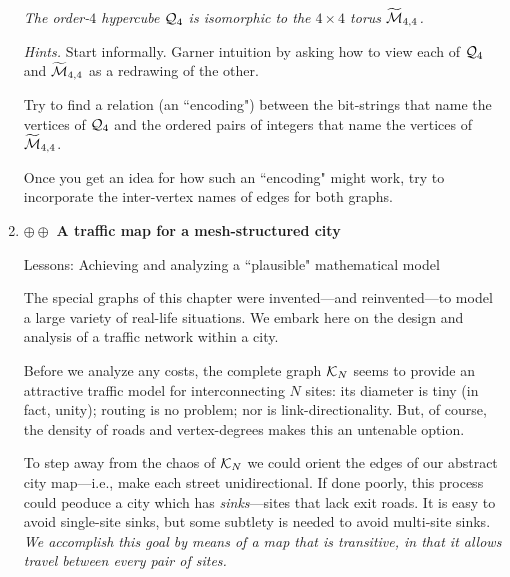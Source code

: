 \begin{enumerate}
{\em The order-$4$ hypercube $\mbox{$\cal Q$}_4$ is \textit{isomorphic} to the $4 \times 4$ torus $\widetilde{\mbox{$\cal M$}}_{4,4}$.}

\medskip

{\it Hints.}
Start informally.  Garner intuition by asking how to view each of $\mbox{$\cal Q$}_4$ and $\widetilde{\mbox{$\cal M$}}_{4,4}$ as a redrawing of the other.

\smallskip

Try to find a relation (an ``encoding") between the bit-strings that name the vertices of $\mbox{$\cal Q$}_4$ and the ordered pairs of integers that name the vertices of $\widetilde{\mbox{$\cal M$}}_{4,4}$.

\smallskip 

Once you get an idea for how such an ``encoding" might work, try to incorporate the inter-vertex names of edges for both graphs.

\medskip\item
$\oplus \oplus$
{\bf A traffic map for a mesh-structured city}

{\sc Lessons:} Achieving and analyzing a ``plausible" mathematical model

\smallskip

The special graphs of this chapter were invented---and reinvented---to model a large variety of real-life situations.  We embark here on the design and analysis of a traffic network within a city.

\smallskip

Before we analyze any costs, the complete graph $\mbox{$\cal K$}_N$ seems to provide an attractive traffic model for interconnecting $N$ sites: its diameter is tiny (in fact, unity); routing is no problem; nor is link-directionality.  But, of course, the density of roads and vertex-degrees makes this an untenable option.

\smallskip

To step away from the chaos of $\mbox{$\cal K$}_N$ we could orient the edges of our abstract city map---i.e., make each street unidirectional.  If done poorly, this process could peoduce a city which has {\em sinks}---sites that lack exit roads.  It is easy to avoid single-site sinks, but some subtlety is needed to avoid multi-site sinks.
{\em We accomplish this goal by means of a map that is {\em transitive}, in that it allows travel between every pair of sites.}

 


\end{enumerate}
